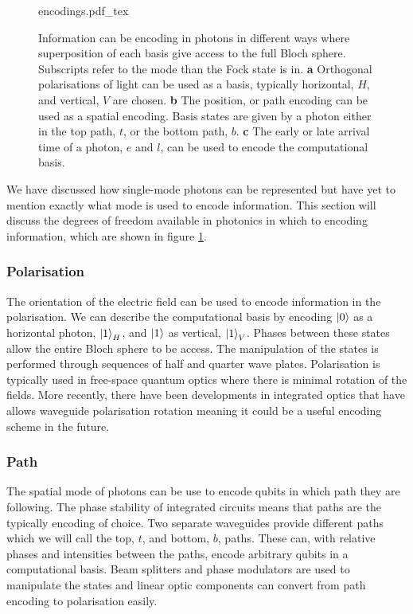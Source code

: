 \begin{figure}
	\centering
	\def\svgwidth{\textwidth}
   	{encodings.pdf_tex}
   	\caption[Quantum information encoding with photons]{Information can be encoding in photons in different ways where superposition of each basis give access to the full Bloch sphere. Subscripts refer to the mode than the Fock state is in. \textbf{a} Orthogonal polarisations of light can be used as a basis, typically horizontal, $H$, and vertical, $V$ are chosen. \textbf{b} The position, or path encoding can be used as a spatial encoding. Basis states are given by a photon either in the top path, $t$, or the bottom path, $b$. \textbf{c} The early or late arrival time of a photon, $e$ and $l$, can be used to encode the computational basis.}
   	\label{fig:encodings}
\end{figure}

We have discussed how single-mode photons can be represented but have yet to mention exactly what mode is used to encode information. This section will discuss the degrees of freedom available in photonics in which to encoding information, which are shown in figure \ref{fig:encodings}.

\subsubsection*{Polarisation}

The orientation of the electric field can be used to encode information in the polarisation.  We can describe the computational basis by encoding $\ket{0}$ as a horizontal photon, $\ket{1}_H$, and $\ket{1}$ as vertical, $\ket{1}_V$. Phases between these states allow the entire Bloch sphere to be access. The manipulation of the states is performed through sequences of half and quarter wave plates. Polarisation is typically used in free-space quantum optics where there is minimal rotation of the fields. More recently, there have been developments in integrated optics that have allows waveguide polarisation rotation \cite{smit2014} meaning it could be a useful encoding scheme in the future.

\subsubsection*{Path}

The spatial mode of photons can be use to encode qubits in which path they are following. The phase stability of integrated circuits means that paths are the typically encoding of choice. Two separate waveguides provide different paths which we will call the top, $t$, and bottom, $b$, paths. These can, with relative phases and intensities between the paths, encode arbitrary qubits in a computational basis. Beam splitters and phase modulators are used to manipulate the states and linear optic components can convert from path encoding to polarisation easily. 

